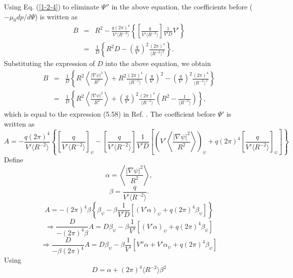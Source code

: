 \documentclass{llncs}
\begin{document}
Using Eq. (\ref{1-2-4}) to eliminate $\Psi''$ in the above equation, the
coefficients before ($- \mu_0 d p / d \Psi$) is written as
\begin{eqnarray}
  B & = & R^2 - \frac{q (2 \pi)^4}{V' \langle R^{- 2} \rangle} \left\{ \left[
  \frac{q}{V' \langle R^{- 2} \rangle} \right] \frac{1}{V' D} V' \right\}
  \nonumber\\
  & = & \frac{1}{D} \left\{ R^2 D - \left( \frac{q}{V'} \right)^2 \frac{(2
  \pi)^4}{\langle R^{- 2} \rangle^2} \right\} . 
\end{eqnarray}
Substituting the expression of $D$ into the above equation, we obtain
\begin{eqnarray}
  B & = & \frac{1}{D} \left\{ R^2 \left\langle \frac{| \nabla \psi |^2}{R^2}
  \right\rangle + R^2 \frac{(2 \pi)^4}{\langle R^{- 2} \rangle} \left(
  \frac{q}{V'} \right)^2 - \left( \frac{q}{V'} \right)^2 \frac{(2
  \pi)^4}{\langle R^{- 2} \rangle^2} \right\} \nonumber\\
  & = & \frac{1}{D} \left\{ R^2 \left\langle \frac{| \nabla \psi |^2}{R^2}
  \right\rangle + \left( \frac{q}{V'} \right)^2 \frac{(2 \pi)^4}{\langle R^{-
  2} \rangle} \left( R^2 - \frac{1}{\langle R^{- 2} \rangle} \right) \right\},
  \label{4-19-1}
\end{eqnarray}
which is equal to the expression (5.58) in Ref. {\cite{jardin2010}}. The
coefficient before $\Psi'$ is written as
\[ A = - \frac{q (2 \pi)^4}{V' \langle R^{- 2} \rangle} \left\{ \left[
   \frac{q}{V' \langle R^{- 2} \rangle} \right]_{\psi} - \left[ \frac{q}{V'
   \langle R^{- 2} \rangle} \right] \frac{1}{V' D} \left[ \left( V'
   \left\langle \frac{| \nabla \psi |^2}{R^2} \right\rangle \right)_{\psi} + q
   (2 \pi)^4 \left[ \frac{q}{V' \langle R^{- 2} \rangle} \right]_{\psi}
   \right] \right\} \]
Define
\[ \alpha = \left\langle \frac{| \nabla \psi |^2}{R^2} \right\rangle, \]
\[ \beta = \frac{q}{V' \langle R^{- 2} \rangle} . \]
\[ A = - (2 \pi)^4 \beta \left\{ \beta_{\psi} - \beta \frac{1}{V' D} [(V'
   \alpha)_{\psi} + q (2 \pi)^4 \beta_{\psi}] \right\} \]
\begin{equation}
  \Longrightarrow \frac{D}{- (2 \pi)^4 \beta} A = D \beta_{\psi} - \beta
  \frac{1}{V'} [(V' \alpha)_{\psi} + q (2 \pi)^4 \beta_{\psi}]
\end{equation}
\begin{equation}
  \Longrightarrow \frac{D}{- \beta (2 \pi)^4} A = D \beta_{\psi} - \beta
  \frac{1}{V'} [V'' \alpha + V' \alpha_{\psi} + q (2 \pi)^4 \beta_{\psi}]
\end{equation}
Using
\begin{equation}
  D = \alpha + (2 \pi)^4 \langle R^{- 2} \rangle \beta^2
\end{equation}
\end{document}
